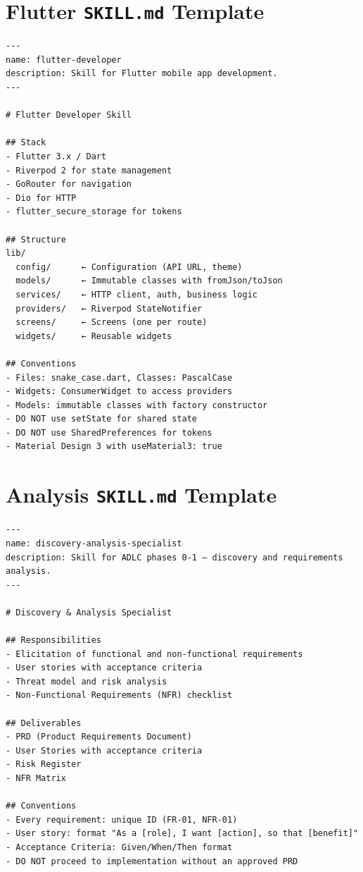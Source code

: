 \section{Flutter \texttt{SKILL.md} Template}

\begin{lstlisting}[language={},title={SKILL.md --- Flutter developer}]
---
name: flutter-developer
description: Skill for Flutter mobile app development.
---

# Flutter Developer Skill

## Stack
- Flutter 3.x / Dart
- Riverpod 2 for state management
- GoRouter for navigation
- Dio for HTTP
- flutter_secure_storage for tokens

## Structure
lib/
  config/      ← Configuration (API URL, theme)
  models/      ← Immutable classes with fromJson/toJson
  services/    ← HTTP client, auth, business logic
  providers/   ← Riverpod StateNotifier
  screens/     ← Screens (one per route)
  widgets/     ← Reusable widgets

## Conventions
- Files: snake_case.dart, Classes: PascalCase
- Widgets: ConsumerWidget to access providers
- Models: immutable classes with factory constructor
- DO NOT use setState for shared state
- DO NOT use SharedPreferences for tokens
- Material Design 3 with useMaterial3: true
\end{lstlisting}

\section{Analysis \texttt{SKILL.md} Template}

\begin{lstlisting}[language={},title={SKILL.md --- Discovery \& Analysis Specialist}]
---
name: discovery-analysis-specialist
description: Skill for ADLC phases 0-1 — discovery and requirements analysis.
---

# Discovery & Analysis Specialist

## Responsibilities
- Elicitation of functional and non-functional requirements
- User stories with acceptance criteria
- Threat model and risk analysis
- Non-Functional Requirements (NFR) checklist

## Deliverables
- PRD (Product Requirements Document)
- User Stories with acceptance criteria
- Risk Register
- NFR Matrix

## Conventions
- Every requirement: unique ID (FR-01, NFR-01)
- User story: format "As a [role], I want [action], so that [benefit]"
- Acceptance Criteria: Given/When/Then format
- DO NOT proceed to implementation without an approved PRD
\end{lstlisting}

